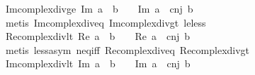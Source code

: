 \begin{isabellebody}
\endisatagproof
{\isafoldproof}%
%
\isadelimproof
\isanewline
%
\endisadelimproof
\isanewline
{}\isamarkupfalse%
\ Im{\isacharunderscore}{\kern0pt}complex{\isacharunderscore}{\kern0pt}div{\isacharunderscore}{\kern0pt}ge{\isacharunderscore}{\kern0pt}{}{\isacharcolon}{\kern0pt}\ {\isachardoublequoteopen}Im\ {\isacharparenleft}{\kern0pt}a\ {\isacharslash}{\kern0pt}\ b{\isacharparenright}{\kern0pt}\ {\isasymge}\ {}\ {\isasymlongleftrightarrow}\ Im\ {\isacharparenleft}{\kern0pt}a\ {\isacharasterisk}{\kern0pt}\ cnj\ b{\isacharparenright}{\kern0pt}\ {\isasymge}\ {}{\isachardoublequoteclose}\isanewline
%
\isadelimproof
\ \ %
\endisadelimproof
%
\isatagproof
{}\isamarkupfalse%
\ {\isacharparenleft}{\kern0pt}metis\ Im{\isacharunderscore}{\kern0pt}complex{\isacharunderscore}{\kern0pt}div{\isacharunderscore}{\kern0pt}eq{\isacharunderscore}{\kern0pt}{}\ Im{\isacharunderscore}{\kern0pt}complex{\isacharunderscore}{\kern0pt}div{\isacharunderscore}{\kern0pt}gt{\isacharunderscore}{\kern0pt}{}\ le{\isacharunderscore}{\kern0pt}less{\isacharparenright}{\kern0pt}%
\endisatagproof
{\isafoldproof}%
%
\isadelimproof
\isanewline
%
\endisadelimproof
\isanewline
{}\isamarkupfalse%
\ Re{\isacharunderscore}{\kern0pt}complex{\isacharunderscore}{\kern0pt}div{\isacharunderscore}{\kern0pt}lt{\isacharunderscore}{\kern0pt}{}{\isacharcolon}{\kern0pt}\ {\isachardoublequoteopen}Re\ {\isacharparenleft}{\kern0pt}a\ {\isacharslash}{\kern0pt}\ b{\isacharparenright}{\kern0pt}\ {\isacharless}{\kern0pt}\ {}\ {\isasymlongleftrightarrow}\ Re\ {\isacharparenleft}{\kern0pt}a\ {\isacharasterisk}{\kern0pt}\ cnj\ b{\isacharparenright}{\kern0pt}\ {\isacharless}{\kern0pt}\ {}{\isachardoublequoteclose}\isanewline
%
\isadelimproof
\ \ %
\endisadelimproof
%
\isatagproof
{}\isamarkupfalse%
\ {\isacharparenleft}{\kern0pt}metis\ less{\isacharunderscore}{\kern0pt}asym\ neq{\isacharunderscore}{\kern0pt}iff\ Re{\isacharunderscore}{\kern0pt}complex{\isacharunderscore}{\kern0pt}div{\isacharunderscore}{\kern0pt}eq{\isacharunderscore}{\kern0pt}{}\ Re{\isacharunderscore}{\kern0pt}complex{\isacharunderscore}{\kern0pt}div{\isacharunderscore}{\kern0pt}gt{\isacharunderscore}{\kern0pt}{}{\isacharparenright}{\kern0pt}%
\endisatagproof
{\isafoldproof}%
%
\isadelimproof
\isanewline
%
\endisadelimproof
\isanewline
{}\isamarkupfalse%
\ Im{\isacharunderscore}{\kern0pt}complex{\isacharunderscore}{\kern0pt}div{\isacharunderscore}{\kern0pt}lt{\isacharunderscore}{\kern0pt}{}{\isacharcolon}{\kern0pt}\ {\isachardoublequoteopen}Im\ {\isacharparenleft}{\kern0pt}a\ {\isacharslash}{\kern0pt}\ b{\isacharparenright}{\kern0pt}\ {\isacharless}{\kern0pt}\ {}\ {\isasymlongleftrightarrow}\ Im\ {\isacharparenleft}{\kern0pt}a\ {\isacharasterisk}{\kern0pt}\ cnj\ b{\isacharparenright}{\kern0pt}\ {\isacharless}{\kern0pt}\ {}{\isachardoublequoteclose}\isanewline

\end{isabellebody}
